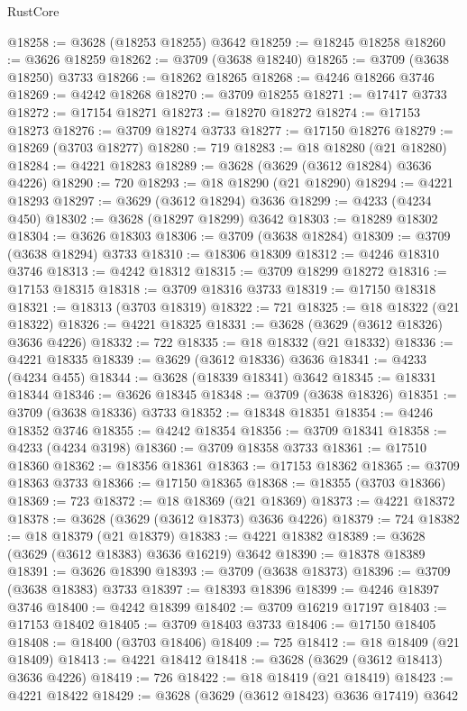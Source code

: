 \begin{lexlean}{RustCore}
\begin{coremodule}
@18258 := @3628 (@18253 @18255) @3642
@18259 := @18245 @18258
@18260 := @3626 @18259
@18262 := @3709 (@3638 @18240)
@18265 := @3709 (@3638 @18250) @3733
@18266 := @18262 @18265
@18268 := @4246 @18266 @3746
@18269 := @4242 @18268
@18270 := @3709 @18255
@18271 := @17417 @3733
@18272 := @17154 @18271
@18273 := @18270 @18272
@18274 := @17153 @18273
@18276 := @3709 @18274 @3733
@18277 := @17150 @18276
@18279 := @18269 (@3703 @18277)
@18280 := 719
@18283 := @18 @18280 (@21 @18280)
@18284 := @4221 @18283
@18289 := @3628 (@3629 (@3612 @18284) @3636 @4226)
@18290 := 720
@18293 := @18 @18290 (@21 @18290)
@18294 := @4221 @18293
@18297 := @3629 (@3612 @18294) @3636
@18299 := @4233 (@4234 @450)
@18302 := @3628 (@18297 @18299) @3642
@18303 := @18289 @18302
@18304 := @3626 @18303
@18306 := @3709 (@3638 @18284)
@18309 := @3709 (@3638 @18294) @3733
@18310 := @18306 @18309
@18312 := @4246 @18310 @3746
@18313 := @4242 @18312
@18315 := @3709 @18299 @18272
@18316 := @17153 @18315
@18318 := @3709 @18316 @3733
@18319 := @17150 @18318
@18321 := @18313 (@3703 @18319)
@18322 := 721
@18325 := @18 @18322 (@21 @18322)
@18326 := @4221 @18325
@18331 := @3628 (@3629 (@3612 @18326) @3636 @4226)
@18332 := 722
@18335 := @18 @18332 (@21 @18332)
@18336 := @4221 @18335
@18339 := @3629 (@3612 @18336) @3636
@18341 := @4233 (@4234 @455)
@18344 := @3628 (@18339 @18341) @3642
@18345 := @18331 @18344
@18346 := @3626 @18345
@18348 := @3709 (@3638 @18326)
@18351 := @3709 (@3638 @18336) @3733
@18352 := @18348 @18351
@18354 := @4246 @18352 @3746
@18355 := @4242 @18354
@18356 := @3709 @18341
@18358 := @4233 (@4234 @3198)
@18360 := @3709 @18358 @3733
@18361 := @17510 @18360
@18362 := @18356 @18361
@18363 := @17153 @18362
@18365 := @3709 @18363 @3733
@18366 := @17150 @18365
@18368 := @18355 (@3703 @18366)
@18369 := 723
@18372 := @18 @18369 (@21 @18369)
@18373 := @4221 @18372
@18378 := @3628 (@3629 (@3612 @18373) @3636 @4226)
@18379 := 724
@18382 := @18 @18379 (@21 @18379)
@18383 := @4221 @18382
@18389 := @3628 (@3629 (@3612 @18383) @3636 @16219) @3642
@18390 := @18378 @18389
@18391 := @3626 @18390
@18393 := @3709 (@3638 @18373)
@18396 := @3709 (@3638 @18383) @3733
@18397 := @18393 @18396
@18399 := @4246 @18397 @3746
@18400 := @4242 @18399
@18402 := @3709 @16219 @17197
@18403 := @17153 @18402
@18405 := @3709 @18403 @3733
@18406 := @17150 @18405
@18408 := @18400 (@3703 @18406)
@18409 := 725
@18412 := @18 @18409 (@21 @18409)
@18413 := @4221 @18412
@18418 := @3628 (@3629 (@3612 @18413) @3636 @4226)
@18419 := 726
@18422 := @18 @18419 (@21 @18419)
@18423 := @4221 @18422
@18429 := @3628 (@3629 (@3612 @18423) @3636 @17419) @3642

\end{coremodule}
\end{lexlean}
